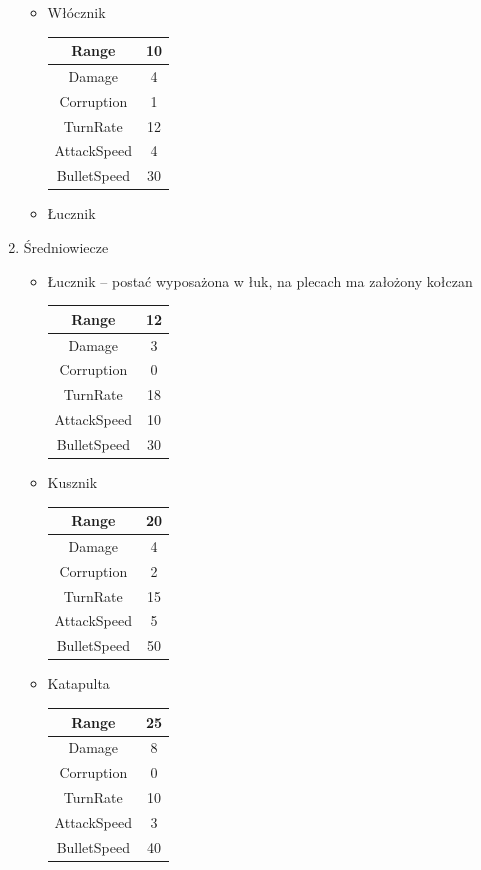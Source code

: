 \documentclass[a4paper,12pt, twoside, titlepage]{article}
\begin{document}
\begin{enumerate}
\begin{itemize}
		\item Włócznik
		\begin{longtable}[l]{|c|c|} 
		\hline
		Range & 10 \\
		\hline
		Damage & 4 \\ 
		\hline 
		Corruption & 1 \\ 
		\hline
		TurnRate & 12 \\ 
		\hline
		AttackSpeed & 4 \\ 
		\hline
		BulletSpeed & 30 \\ 
		\hline
		\end{longtable}	
		\item Łucznik
		
	\end{itemize}

	\item Średniowiecze
	\begin{itemize}
		\item Łucznik -- postać wyposażona w łuk, na plecach ma założony kołczan
		\begin{longtable}[l]{|c|c|} 
		\hline
		Range & 12 \\
		\hline
		Damage & 3 \\ 
		\hline 
		Corruption & 0 \\ 
		\hline
		TurnRate & 18 \\ 
		\hline
		AttackSpeed & 10 \\ 
		\hline
		BulletSpeed & 30 \\ 
		\hline
		\end{longtable}	
		
		\item Kusznik
		\begin{longtable}[l]{|c|c|} 
		\hline
		Range & 20 \\
		\hline
		Damage & 4 \\ 
		\hline 
		Corruption & 2 \\ 
		\hline
		TurnRate & 15 \\ 
		\hline
		AttackSpeed & 5 \\ 
		\hline
		BulletSpeed & 50 \\ 
		\hline
		\end{longtable}		
	
		\item Katapulta
		\begin{longtable}[l]{|c|c|} 
		\hline
		Range & 25 \\
		\hline
		Damage & 8 \\ 
		\hline 
		Corruption & 0 \\ 
		\hline
		TurnRate & 10 \\ 
		\hline
		AttackSpeed & 3 \\ 
		\hline
		BulletSpeed & 40 \\ 
		\hline
		\end{longtable}	
	\end{itemize}
	
\end{enumerate} 
 
\end{document}

